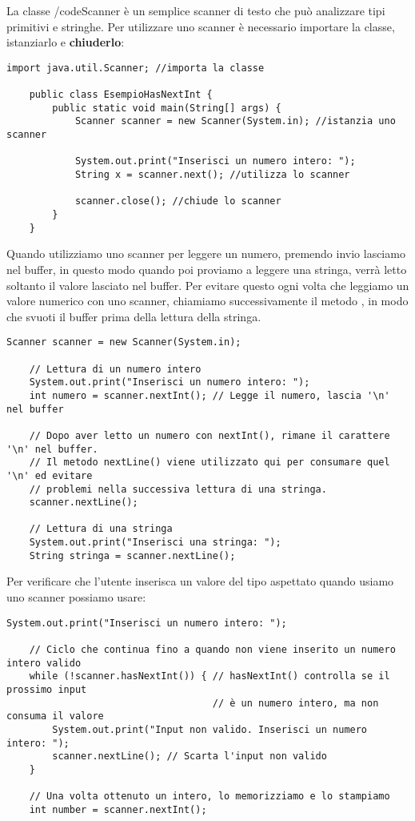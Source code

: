 \documentclass[../main.tex]{subfiles}
\begin{document}
La classe /code{Scanner} è un semplice scanner di testo che può analizzare tipi primitivi e stringhe.
Per utilizzare uno scanner è necessario importare la classe, istanziarlo e \textbf{chiuderlo}:
\begin{lstlisting}[style=java]
    import java.util.Scanner; //importa la classe

    public class EsempioHasNextInt {
        public static void main(String[] args) {
            Scanner scanner = new Scanner(System.in); //istanzia uno scanner

            System.out.print("Inserisci un numero intero: ");
            String x = scanner.next(); //utilizza lo scanner

            scanner.close(); //chiude lo scanner
        }
    }

\end{lstlisting}

Quando utilizziamo uno scanner per leggere un numero, premendo invio lasciamo  nel buffer, in questo modo  quando
poi proviamo a leggere una stringa, verrà letto soltanto il valore lasciato nel buffer. Per evitare questo ogni volta che leggiamo
un valore numerico con uno scanner, chiamiamo successivamente il metodo , in modo che svuoti il buffer prima della
lettura della stringa.
\begin{lstlisting}[style=java]
    Scanner scanner = new Scanner(System.in);

    // Lettura di un numero intero
    System.out.print("Inserisci un numero intero: ");
    int numero = scanner.nextInt(); // Legge il numero, lascia '\n' nel buffer

    // Dopo aver letto un numero con nextInt(), rimane il carattere '\n' nel buffer.
    // Il metodo nextLine() viene utilizzato qui per consumare quel '\n' ed evitare
    // problemi nella successiva lettura di una stringa.
    scanner.nextLine();

    // Lettura di una stringa
    System.out.print("Inserisci una stringa: ");
    String stringa = scanner.nextLine();
\end{lstlisting}

Per verificare che l'utente inserisca un valore del tipo aspettato quando usiamo uno scanner possiamo usare:
\begin{lstlisting}[style=java]
    System.out.print("Inserisci un numero intero: ");

    // Ciclo che continua fino a quando non viene inserito un numero intero valido
    while (!scanner.hasNextInt()) { // hasNextInt() controlla se il prossimo input
                                    // è un numero intero, ma non consuma il valore
        System.out.print("Input non valido. Inserisci un numero intero: ");
        scanner.nextLine(); // Scarta l'input non valido
    }

    // Una volta ottenuto un intero, lo memorizziamo e lo stampiamo
    int number = scanner.nextInt();
\end{lstlisting}
\end{document}
